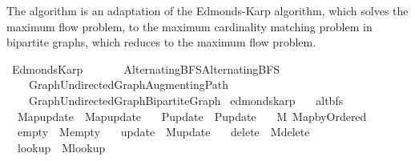 \begin{isabellebody}
\begin{isamarkuptext}
The algorithm is an adaptation of the Edmonds-Karp algorithm, which solves the
maximum flow problem, to the maximum cardinality matching problem in bipartite graphs, which reduces
to the maximum flow problem.%
\end{isamarkuptext}\isamarkuptrue%
%
\isadelimtheory
%
\endisadelimtheory
%
\isatagtheory
{}\isamarkupfalse%
\ Edmonds{\isacharunderscore}{\kern0pt}Karp\isanewline
\ \ \isanewline
\ \ \ \ {\isachardoublequoteopen}{\isachardot}{\kern0pt}{\isachardot}{\kern0pt}{\isacharslash}{\kern0pt}Alternating{\isacharunderscore}{\kern0pt}BFS{\isacharslash}{\kern0pt}Alternating{\isacharunderscore}{\kern0pt}BFS{\isachardoublequoteclose}\isanewline
\ \ \ \ {\isachardoublequoteopen}{\isachardot}{\kern0pt}{\isachardot}{\kern0pt}{\isacharslash}{\kern0pt}Graph{\isacharslash}{\kern0pt}Undirected{\isacharunderscore}{\kern0pt}Graph{\isacharslash}{\kern0pt}Augmenting{\isacharunderscore}{\kern0pt}Path{\isachardoublequoteclose}\isanewline
\ \ \ \ {\isachardoublequoteopen}{\isachardot}{\kern0pt}{\isachardot}{\kern0pt}{\isacharslash}{\kern0pt}Graph{\isacharslash}{\kern0pt}Undirected{\isacharunderscore}{\kern0pt}Graph{\isacharslash}{\kern0pt}Bipartite{\isacharunderscore}{\kern0pt}Graph{\isachardoublequoteclose}\isanewline
{}%
\endisatagtheory
{\isafoldtheory}%
%
\isadelimtheory
%
\endisadelimtheory
%
\isadelimdocument
%
\endisadelimdocument
%
\isatagdocument
%
\isamarkuptrue%
%
\endisatagdocument
{\isafolddocument}%
%
\isadelimdocument
%
\endisadelimdocument
{}\isamarkupfalse%
\ edmonds{\isacharunderscore}{\kern0pt}karp\ {\isacharequal}{\kern0pt}\isanewline
\ \ alt{\isacharunderscore}{\kern0pt}bfs\ \isanewline
\ \ Map{\isacharunderscore}{\kern0pt}update\ {\isacharequal}{\kern0pt}\ Map{\isacharunderscore}{\kern0pt}update\ \isanewline
\ \ P{\isacharunderscore}{\kern0pt}update\ {\isacharequal}{\kern0pt}\ P{\isacharunderscore}{\kern0pt}update\ {\isacharplus}{\kern0pt}\isanewline
\ \ M{\isacharcolon}{\kern0pt}\ Map{\isacharunderscore}{\kern0pt}by{\isacharunderscore}{\kern0pt}Ordered\ \isanewline
\ \ empty\ {\isacharequal}{\kern0pt}\ M{\isacharunderscore}{\kern0pt}empty\ \isanewline
\ \ update\ {\isacharequal}{\kern0pt}\ M{\isacharunderscore}{\kern0pt}update\ \isanewline
\ \ delete\ {\isacharequal}{\kern0pt}\ M{\isacharunderscore}{\kern0pt}delete\ \isanewline
\ \ lookup\ {\isacharequal}{\kern0pt}\ M{\isacharunderscore}{\kern0pt}lookup\ \isanewline

\end{isabellebody}
